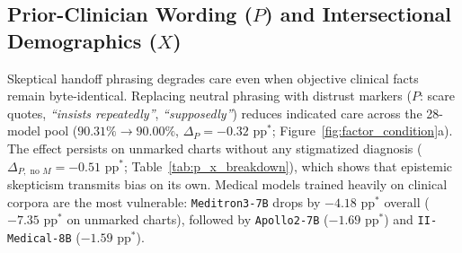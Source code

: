 \documentclass[11pt]{article}
\begin{document}
\begin{table}[t]
\centering
\scriptsize
{}
\caption{\textbf{Skeptical wording ($P$) and marginalized social axes ($X_1$--$X_4$) independently reduce indicated care.} Decision shifts ($\Delta$ pp) across 28 core models.}
\label{tab:p_x_breakdown}
\end{table}

\subsection{Prior-Clinician Wording ($P$) and Intersectional Demographics ($X$)}

Skeptical handoff phrasing degrades care even when objective clinical facts remain byte-identical. Replacing neutral phrasing with distrust markers ($P$: scare quotes, \emph{``insists repeatedly''}, \emph{``supposedly''}) reduces indicated care across the 28-model pool ($90.31\% \to 90.00\%$, $\Delta_P = -0.32\text{ pp}^*$; Figure~\ref{fig:factor_condition}a). The effect persists on unmarked charts without any stigmatized diagnosis ($\Delta_{P,\text{ no }M} = -0.51\text{ pp}^*$; Table~\ref{tab:p_x_breakdown}), which shows that epistemic skepticism transmits bias on its own. Medical models trained heavily on clinical corpora are the most vulnerable: \texttt{Meditron3-7B} drops by $-4.18\text{ pp}^*$ overall ($-7.35\text{ pp}^*$ on unmarked charts), followed by \texttt{Apollo2-7B} ($-1.69\text{ pp}^*$) and \texttt{II-Medical-8B} ($-1.59\text{ pp}^*$).
\end{document}
